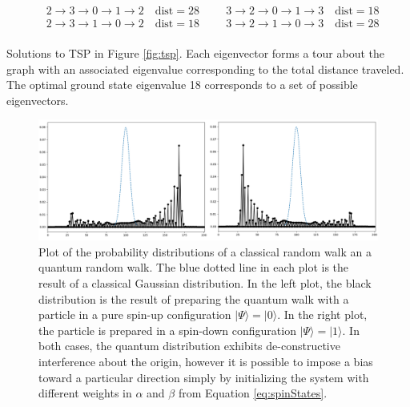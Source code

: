 \begin{table}[h]
\[\begin{split}
			&2 \rightarrow 3 \rightarrow 0 \rightarrow 1 \rightarrow 2 \quad \text{dist}=28 \hspace{1cm} 3 \rightarrow 2 \rightarrow 0 \rightarrow 1 \rightarrow 3 \quad \text{dist}=18\\
			&2 \rightarrow 3 \rightarrow 1 \rightarrow 0 \rightarrow 2 \quad \text{dist}=18 \hspace{1cm} 3 \rightarrow 2 \rightarrow 1 \rightarrow 0 \rightarrow 3 \quad \text{dist}=28\\
		\end{split}
		\]
		\caption{\doublespacing Solutions to TSP in Figure \ref{fig:tsp}. 
			Each eigenvector forms a tour about the graph with an associated eigenvalue corresponding to the total distance traveled. 
			The optimal ground state eigenvalue 18 corresponds to a set of possible eigenvectors.}
		\label{tab:eigenset}
	\end{table}
		\begin{figure}[h]
			\begin{center}
				\includegraphics[width=16cm]{images/bias}
			\end{center}
			\caption{\doublespacing Plot of the probability distributions of a classical random walk an a quantum random walk. 
				The blue dotted line in each plot is the result of a classical Gaussian distribution. 
				In the left plot, the black distribution is the result of preparing the quantum walk with a particle in a pure spin-up configuration $|\Psi\rangle = |0\rangle$. 
				In the right plot, the particle is prepared in a spin-down configuration $|\Psi\rangle = |1\rangle$. 
				In both cases, the quantum distribution exhibits de-constructive interference about the origin, however it is possible to impose a bias toward a particular direction simply by initializing the system with different weights in $\alpha$ and $\beta$ from Equation \ref{eq:spinStates}.}
			\label{fig:biasWalk}
		\end{figure}

